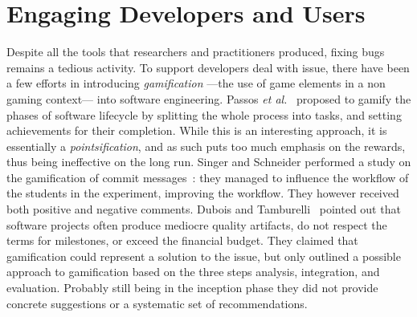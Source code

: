 %



\section{Engaging Developers and Users}\label{sec:related-gamification}

Despite all the tools that researchers and practitioners produced, fixing bugs remains a tedious activity.
To support developers deal with issue, there have been a few efforts in introducing \emph{gamification} ---the use of game elements in a non gaming context--- into software engineering.
Passos \textit{et al.}~\cite{PassosMNC11} proposed to gamify the phases of software lifecycle by splitting the whole process into tasks, and setting achievements for their completion.
While this is an interesting approach, it is essentially a \emph{pointsification}, and as such puts too much emphasis on the rewards, thus being ineffective on the long run.
Singer and Schneider performed a study on the gamification of commit messages~\cite{sing2012}: they managed to influence the workflow of the students in the experiment, improving the workflow.
They however received both positive and negative comments.
Dubois and Tamburelli~\cite{Dubois2013a} pointed out that software projects often produce mediocre quality artifacts, do not respect the terms for milestones, or exceed the financial budget.
They claimed that gamification could represent a solution to the issue, but only outlined a possible approach to gamification based on the three steps analysis, integration, and evaluation.
Probably still being in the inception phase they did not provide concrete suggestions or a systematic set of recommendations.


